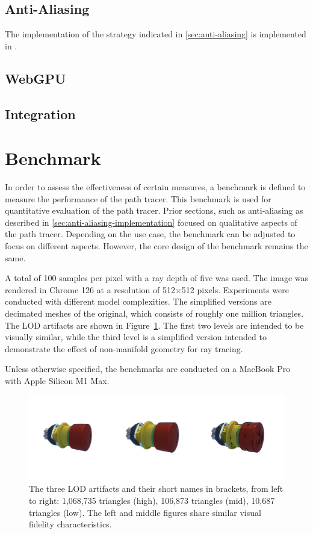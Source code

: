 \subsection{Anti-Aliasing}

The implementation of the strategy indicated in \ref{sec:anti-aliasing} is implemented in .


\subsection{WebGPU}
\subsection{Integration}

\section{Benchmark}

In order to assess the effectiveness of certain measures, a benchmark is defined to measure the performance of the path tracer. This benchmark is used for quantitative evaluation of the path tracer. Prior sections, such as anti-aliasing as described in \autoref{sec:anti-aliasing-implementation} focused on qualitative aspects of the path tracer. Depending on the use case, the benchmark can be adjusted to focus on different aspects. However, the core design of the benchmark remains the same.

A total of 100 samples per pixel with a ray depth of five was used. The image was rendered in Chrome 126 at a resolution of 512$\times$512 pixels. Experiments were conducted with different model complexities. The simplified versions are decimated meshes of the original, which consists of roughly one million triangles. The LOD artifacts are shown in Figure~\ref{fig:benchmark-models}. The first two levels are intended to be visually similar, while the third level is a simplified version intended to demonstrate the effect of non-manifold geometry for ray tracing.

Unless otherwise specified, the benchmarks are conducted on a MacBook Pro with Apple Silicon M1 Max.

\begin{figure}[H]
    \includegraphics[width=0.9\columnwidth]{resources/benchmark-models.png}
    \caption{The three LOD artifacts and their short names in brackets, from left to right: 1,068,735 triangles (high), 106,873 triangles (mid), 10,687 triangles (low). The left and middle figures share similar visual fidelity characteristics.}
    \label{fig:benchmark-models}
\end{figure}

